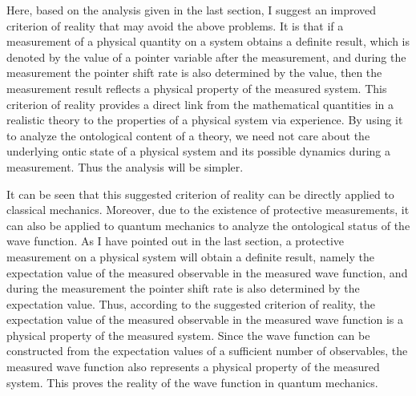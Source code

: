 Here, based on the analysis given in the last section, I suggest an improved criterion of reality that may avoid the above problems. 
It is that if a measurement of a physical quantity on a system obtains a definite result, which is denoted by the value of a pointer variable after the measurement, and during the measurement the pointer shift rate is also determined by the value, then the measurement result reflects a physical property of the measured system. This criterion of reality provides a direct link from the mathematical quantities in a realistic theory to the properties of a physical system via experience. By using it to analyze the ontological content of a theory, we need not care about the underlying ontic state of a physical system and its possible dynamics during a measurement. Thus the analysis will be simpler.  

It can be seen that this suggested criterion of reality can be directly applied to classical mechanics. Moreover, due to the existence of protective measurements, it can also be applied to quantum mechanics to analyze the ontological status of the wave function. 
As I have pointed out in the last section, a protective measurement on a physical system will obtain a definite result, namely the expectation value of the measured observable in the measured wave function, and during the measurement the pointer shift rate is also determined by the expectation value. 
Thus, according to the suggested criterion of reality, the expectation value of the measured observable in the measured wave function is a physical property of the measured system. Since the wave function can be constructed from the expectation values of a sufficient number of observables, the measured wave function also represents a physical property of the measured system. This proves the reality of the wave function in quantum mechanics.

